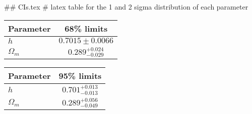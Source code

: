 ## CIs.tex
# latex table for the 1 and 2 sigma distribution of each parameter

\begin{tabular} { l  c}
 Parameter &  68\% limits\\
\hline
{\boldmath$h              $} & $0.7015\pm 0.0066          $\\
{\boldmath$\Omega_m       $} & $0.289^{+0.024}_{-0.029}   $\\
\hline
\end{tabular}

\begin{tabular} { l  c}
 Parameter &  95\% limits\\
\hline
{\boldmath$h              $} & $0.701^{+0.013}_{-0.013}   $\\
{\boldmath$\Omega_m       $} & $0.289^{+0.056}_{-0.049}   $\\
\hline
\end{tabular}
